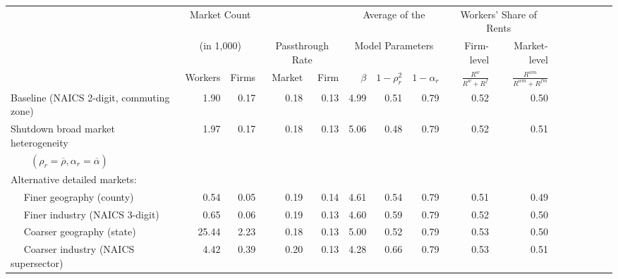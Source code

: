 \begin{tabular}{lrrrrrrrrrrrrrrr}
\toprule 
\midrule 
 & \multicolumn{2}{c}{Market Count } & \multicolumn{2}{c}{} & \multicolumn{3}{c}{Average of the} & \multicolumn{2}{c}{Workers' Share of Rents} \\
 & \multicolumn{2}{c}{(in 1,000)} & \multicolumn{2}{c}{Passthrough Rate} & \multicolumn{3}{c}{Model Parameters} & Firm-level & Market-level \\
 \cmidrule(lr){2-3} \cmidrule(lr){4-5} \cmidrule(lr){6-8} \cmidrule(lr){9-10} 
 & Workers & Firms & Market & Firm & $\beta$ & $1-\rho^2_r$ & $1-\alpha_r$ & $\frac{R^w}{R^w + R^f}$ & $\frac{R^{wm}}{R^{wm} + R^{fm}}$ \\
\midrule 
\midrule 
Baseline (NAICS 2-digit, commuting zone) & 1.90 & 0.17 & 0.18 & 0.13 & 4.99 & 0.51 & 0.79 & 0.52 & 0.50 \\[5pt]
Shutdown broad market heterogeneity & 1.97 & 0.17 & 0.18 & 0.13 & 5.06 & 0.48 & 0.79 & 0.52 & 0.51 \\
$\qquad (\rho_r=\overline{\rho},\alpha_r=\overline{\alpha})$ \\[5pt]
Alternative detailed markets: \\
$\quad$ Finer geography (county) & 0.54 & 0.05 & 0.19 & 0.14 & 4.61 & 0.54 & 0.79 & 0.51 & 0.49 \\
$\quad$ Finer industry (NAICS 3-digit) & 0.65 & 0.06 & 0.19 & 0.13 & 4.60 & 0.59 & 0.79 & 0.52 & 0.50 \\
$\quad$ Coarser geography (state) & 25.44 & 2.23 & 0.18 & 0.13 & 5.00 & 0.52 & 0.79 & 0.53 & 0.50 \\
$\quad$ Coarser industry (NAICS supersector) & 4.42 & 0.39 & 0.20 & 0.13 & 4.28 & 0.66 & 0.79 & 0.53 & 0.51 \\
\midrule 
\bottomrule 
\end{tabular}
